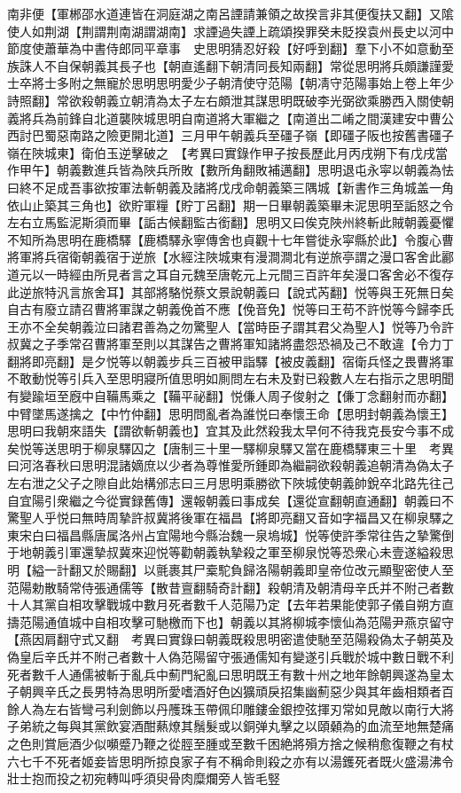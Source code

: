 南非便【軍郴邵水道連皆在洞庭湖之南呂諲請兼領之故揆言非其便復扶又翻】又隂使人如荆湖【荆謂荆南湖謂湖南】求諲過失諲上疏頌揆罪癸未貶揆袁州長史以河中節度使蕭華為中書侍郎同平章事　史思明猜忍好殺【好呼到翻】羣下小不如意動至族誅人不自保朝義其長子也【朝直遙翻下朝清同長知兩翻】常從思明將兵頗謙謹愛士卒將士多附之無寵於思明思明愛少子朝清使守范陽【朝凊守范陽事始上卷上年少詩照翻】常欲殺朝義立朝清為太子左右頗泄其謀思明既破李光弼欲乘勝西入關使朝義將兵為前鋒自北道襲陜城思明自南道將大軍繼之【南道出二崤之間漢建安中曹公西討巴蜀惡南路之險更開北道】三月甲午朝義兵至礓子嶺【即礓子阪也按舊書礓子嶺在陜城東】衛伯玉逆擊破之　【考異曰實錄作甲子按長歷此月丙戌朔下有戊戌當作甲午】朝義數進兵皆為陜兵所敗【數所角翻敗補邁翻】思明退屯永寜以朝義為怯曰終不足成吾事欲按軍法斬朝義及諸將戊戌命朝義築三隅城【新書作三角城盖一角依山止築其三角也】欲貯軍糧【貯丁呂翻】期一日畢朝義築畢未泥思明至詬怒之令左右立馬監泥斯須而畢【詬古候翻監古銜翻】思明又曰俟克陜州終斬此賊朝義憂懼不知所為思明在鹿橋驛【鹿橋驛永寧傳舍也貞觀十七年嘗徙永寜縣於此】令腹心曹將軍將兵宿衛朝義宿于逆旅【水經注陜城東有漫澗澗北有逆旅亭謂之漫口客舍此酈道元以一時經由所見者言之耳自元魏至唐乾元上元間三百許年矣漫口客舍必不復存此逆旅特汎言旅舍耳】其部將駱悦蔡文景說朝義曰【說式芮翻】悦等與王死無日矣自古有廢立請召曹將軍謀之朝義俛首不應【俛音免】悦等曰王苟不許悦等今歸李氏王亦不全矣朝義泣曰諸君善為之勿驚聖人【當時臣子謂其君父為聖人】悦等乃令許叔冀之子季常召曹將軍至則以其謀告之曹將軍知諸將盡怨恐禍及己不敢違【令力丁翻將即亮翻】是夕悦等以朝義步兵三百被甲詣驛【被皮義翻】宿衛兵怪之畏曹將軍不敢動悦等引兵入至思明寢所值思明如厠問左右未及對已殺數人左右指示之思明聞有變踰垣至廐中自鞴馬乘之【鞴平祕翻】悦傔人周子俊射之【傔丁念翻射而亦翻】中臂墜馬遂擒之【中竹仲翻】思明問亂者為誰悦曰奉懷王命【思明封朝義為懷王】思明曰我朝來語失【謂欲斬朝義也】宜其及此然殺我太早何不待我克長安今事不成矣悦等送思明于柳泉驛囚之【唐制三十里一驛柳泉驛又當在鹿橋驛東三十里　考異曰河洛春秋曰思明混諸嫡庶以少者為尊惟愛所鍾即為繼嗣欲殺朝義追朝清為偽太子左右泄之父子之隙自此始構邠志曰三月思明乘勝欲下陜城使朝義帥銳卒北路先往己自宜陽引衆繼之今從實録舊傳】還報朝義曰事成矣【還從宣翻朝直通翻】朝義曰不驚聖人乎悦曰無時周摯許叔冀將後軍在福昌【將即亮翻又音如字福昌又在柳泉驛之東宋白曰福昌縣唐属洛州占宜陽地今縣治魏一泉塢城】悦等使許季常往告之摯驚倒于地朝義引軍還摯叔冀來迎悦等勸朝義執摯殺之軍至柳泉悦等恐衆心未壹遂縊殺思明【縊一計翻又於賜翻】以氈裹其尸槖駝負歸洛陽朝義即皇帝位改元顯聖密使人至范陽勅散騎常侍張通儒等【散昔亶翻騎奇計翻】殺朝清及朝清母辛氏并不附己者數十人其黨自相攻擊戰城中數月死者數千人范陽乃定【去年若果能使郭子儀自朔方直擣范陽通值城中自相攻擊可馳檄而下也】朝義以其將柳城李懷仙為范陽尹燕京留守【燕因肩翻守式又翻　考異曰實錄曰朝義既殺思明密遣使馳至范陽殺偽太子朝英及偽皇后辛氏并不附己者數十人偽范陽留守張通儒知有變遂引兵戰於城中數日戰不利死者數千人通儒被斬于亂兵中薊門紀亂曰思明既王有數十州之地年餘朝興遂為皇太子朝興辛氏之長男特為思明所愛嗜酒好色凶獷頑戾招集幽薊惡少與其年齒相類者百餘人為左右皆彎弓利劍飾以丹雘珠玉帶佩印雕鏤金銀控弦揮刃常如見敵以南行大將子弟統之每與其黨飲宴酒酣爇燎其鬚髮或以銅弹丸擊之以頤顙為的血流至地無楚痛之色則賞巵酒少似嚬蹙乃鞭之從脛至腫或至數千困絶將殞方捨之候稍愈復鞭之有杖六七千不死者姬妾皆思明所掠良家子有不稱命則殺之亦有以湯鑊死者既火盛湯沸令壯士抱而投之初宛轉叫呼須臾骨肉糜爛旁人皆毛竪